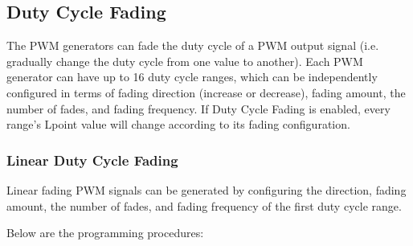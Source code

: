 \documentclass[main\_\_EN.tex]{subfiles}
\begin{document}
\subsection{Duty Cycle Fading}

The PWM generators can fade the duty cycle of a PWM output signal (i.e. gradually change the duty cycle from one value to another). Each PWM generator can have up to 16 duty cycle ranges, which can be independently configured in terms of fading direction (increase or decrease), fading amount, the number of fades, and fading frequency. If Duty Cycle Fading is enabled, every range's Lpoint value will change according to its fading configuration.

\subsubsection{Linear Duty Cycle Fading}
\label{sec:ledc-pwm-linear-duty-cycle-fading}

Linear fading PWM signals can be generated by configuring the  direction, fading amount, the number of fades, and fading frequency of the first duty cycle range.

Below are the programming procedures:
\end{document}
